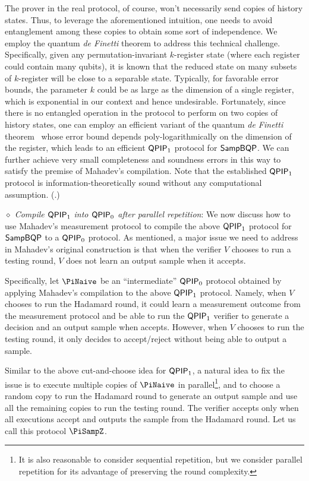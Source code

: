 The prover in the real protocol, of course, won't necessarily send copies of history states. Thus, to leverage the aforementioned intuition, one needs to avoid entanglement among these copies to obtain some sort of independence. 
We employ the quantum \emph{de Finetti} theorem to address this technical challenge.
Specifically, given any permutation-invariant $k$-register state (where each register could contain many qubits), it is known that the reduced state on many subsets of $k$-register will be close to a separable state. 
Typically, for favorable error bounds, the parameter $k$ could be as large as the dimension of a single register, which is exponential in our context and hence undesirable. 
Fortunately, since there is no entangled operation in the protocol to perform on two copies of history states, one can employ an efficient variant of the quantum \emph{de Finetti} theorem~\cite{Brandao2017} whose error bound depends poly-logarithmically on the dimension of the register, which leads to an efficient $\operatorname{\mathsf{QPIP}}_1$ protocol for $\operatorname{\mathsf{SampBQP}}$. 
We can further achieve very small completeness and soundness errors in this way to satisfy the premise of Mahadev's compilation.  
Note that the established $\operatorname{\mathsf{QPIP}}_1$ protocol is information-theoretically sound without any computational assumption.  (.)

\vspace{2mm} \noindent  \emph{$\diamond$ Compile $\operatorname{\mathsf{QPIP}}_1$ into $\operatorname{\mathsf{QPIP}}_0$ after parallel repetition}: We now discuss how to use Mahadev's measurement protocol to compile the above $\operatorname{\mathsf{QPIP}}_1$ protocol for $\operatorname{\mathsf{SampBQP}}$ to a $\operatorname{\mathsf{QPIP}}_0$ protocol. As mentioned, a major issue we need to address in Mahadev's original construction is that when the verifier $V$ chooses to run a testing round, $V$ does not learn an output sample when it accepts.  %

Specifically, let $\PiNaive$ be an ``intermediate'' $\operatorname{\mathsf{QPIP}}_0$ protocol obtained by applying Mahadev's compilation to the above $\operatorname{\mathsf{QPIP}}_1$ protocol. Namely, when $V$ chooses to run the Hadamard round, it could learn a measurement outcome from the measurement protocol and be able to run the $\operatorname{\mathsf{QPIP}}_1$ verifier to generate a decision and an output sample when accepts. However, when  $V$ chooses to run the testing round, it only decides to accept/reject without being able to output a sample. 

Similar to the above cut-and-choose idea for $\operatorname{\mathsf{QPIP}}_1$, a natural idea to fix the issue is to execute multiple copies of $\PiNaive$ in parallel\footnote{It is also reasonable to consider sequential repetition, but we consider parallel repetition for its advantage of preserving the round complexity.}, and to choose a random copy to run the Hadamard round to generate an output sample and use all the remaining copies to run the testing round. The verifier accepts only when all executions accept and outputs the sample from the Hadamard round. Let us call this protocol $\PiSampZ$.


